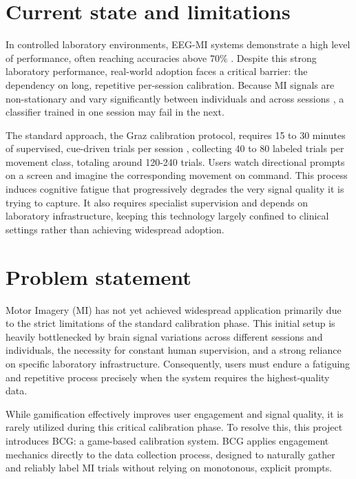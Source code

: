 \documentclass[a4paper, 11pt, openany]{report}
\let\cite\citep
\begin{document}
    \section{Current state and limitations}

    In controlled laboratory environments, EEG-MI systems demonstrate a high level of performance, often reaching accuracies above 
    70\% \cite{wolpaw2002brain, kubler2001brain}. Despite this strong laboratory performance, real-world 
    adoption faces a critical barrier: the dependency on long, repetitive per-session calibration. Because MI signals are non-stationary 
    and vary significantly between individuals and across sessions \cite{sugiyama2007covariate, lotte2018review}, a classifier trained in one session may fail in 
    the next.

    The standard approach, the Graz calibration protocol, requires 15 to 30 minutes of supervised, cue-driven trials per session \cite{giles2022transfer, kueper2024avoidance}, 
    collecting 40 to 80 labeled trials per movement class, totaling around 120-240 trials. Users watch directional 
    prompts on a screen and imagine the corresponding movement on command. This process induces cognitive fatigue that progressively 
    degrades the very signal quality it is trying to capture. It also requires specialist supervision and depends on 
    laboratory infrastructure, keeping this technology largely confined to clinical settings rather than achieving widespread adoption.


    \section{Problem statement}

    Motor Imagery (MI) has not yet achieved widespread application primarily due to the strict limitations of the standard calibration phase. 
    This initial setup is heavily bottlenecked by brain signal variations across different sessions and individuals, 
    the necessity for constant human supervision, and a strong reliance on specific laboratory infrastructure. Consequently, users must endure
    a fatiguing and repetitive process precisely when the system requires the highest-quality data.

    While gamification effectively improves user engagement and signal quality, it is rarely utilized during this critical calibration phase. 
    To resolve this, this project introduces BCG: a game-based calibration system. BCG applies engagement mechanics directly to the data 
    collection process, designed to naturally gather and reliably label MI trials without relying on monotonous, explicit prompts.
\end{document}
